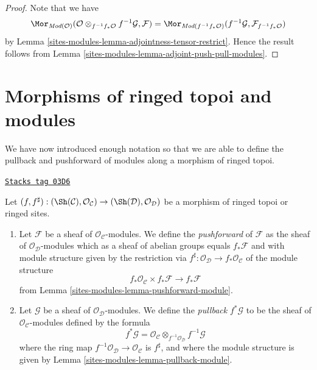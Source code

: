 \begin{proof}
Note that we have
$$
\Mor_{\textit{Mod}(\mathcal{O})}(
\mathcal{O} \otimes_{f^{-1}f_*\mathcal{O}} f^{-1}\mathcal{G}, \mathcal{F})
=
\Mor_{\textit{Mod}(f^{-1}f_*\mathcal{O})}(
f^{-1}\mathcal{G}, \mathcal{F}_{f^{-1}f_*\mathcal{O}})
$$
by Lemma \ref{sites-modules-lemma-adjointness-tensor-restrict}. Hence the result follows
from Lemma \ref{sites-modules-lemma-adjoint-push-pull-modules}.
\end{proof}

\section{Morphisms of ringed topoi and modules}
\label{sites-modules-section-functoriality-modules}
We have now introduced enough notation so that we are able to
define the pullback and pushforward of modules along a morphism
of ringed topoi.

\begin{definition}[Pushforward]
\label{sites-modules-definition-pushforward}
\href{https://stacks.math.columbia.edu/tag/03D6}{\texttt{Stacks tag 03D6}}

Let
$(f, f^\sharp) :
(\Sh(\mathcal{C}), \mathcal{O}_\mathcal{C})
\to
(\Sh(\mathcal{D}), \mathcal{O}_\mathcal{D})$
be a morphism of ringed topoi or ringed sites.
\begin{enumerate}
\item Let $\mathcal{F}$ be a sheaf of $\mathcal{O}_\mathcal{C}$-modules.
We define the {\it pushforward} of $\mathcal{F}$ as the
sheaf of $\mathcal{O}_\mathcal{D}$-modules which as a sheaf
of abelian groups equals $f_*\mathcal{F}$ and with
module structure given by the restriction
via $f^\sharp : \mathcal{O}_\mathcal{D} \to f_*\mathcal{O}_\mathcal{C}$
of the module structure
$$
f_*\mathcal{O}_\mathcal{C} \times f_*\mathcal{F}
\longrightarrow
f_*\mathcal{F}
$$
from Lemma \ref{sites-modules-lemma-pushforward-module}.
\item Let $\mathcal{G}$ be a sheaf of $\mathcal{O}_\mathcal{D}$-modules.
We define the {\it pullback} $f^*\mathcal{G}$ to be the
sheaf of $\mathcal{O}_\mathcal{C}$-modules defined by the formula
$$
f^*\mathcal{G}
=
\mathcal{O}_\mathcal{C} \otimes_{f^{-1}\mathcal{O}_\mathcal{D}}
f^{-1}\mathcal{G}
$$
where the ring map
$f^{-1}\mathcal{O}_\mathcal{D} \to \mathcal{O}_\mathcal{C}$
is $f^\sharp$, and where the  module
structure is given by Lemma \ref{sites-modules-lemma-pullback-module}.
\end{enumerate}
\end{definition}

